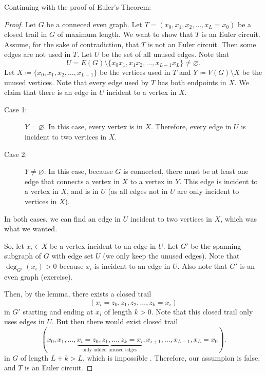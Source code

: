 
Continuing with the proof of Euler's Theorem:

\begin{proof}
	Let \( G \) be a conneced even graph. Let \( T = (x_{0}, x_{1}, x_{2}, \ldots , x_L = x_{0})\) be a closed trail in \( G \) of maximum length. We want to show that \( T \) is an Euler circuit. Assume, for the sake of contradiction, that \( T \) is not an Euler circuit. Then some edges are not used in \( T \). Let \( U \) be the set of all unused edges. Note that
	\[
		U = E(G) \setminus \{x_{0}x_{1}, x_{1}x_{2}, \ldots , x_{L-1}x_L\} \neq \varnothing
	.\] 
	Let \( X \coloneq \{x_{0}, x_{1}, x_{2}, \ldots , x_{L-1}\}   \) be the vertices used in \( T \) and \( Y \coloneqq V(G) \setminus X \) be the unused vertices. Note that every edge used by \( T \) has both endpoints in \( X \). We claim that there is an edge in \( U \) incident to a vertex in \( X \).
	\begin{description}
		\item[Case 1:]\( Y = \varnothing \). In this case, every vertex is in \( X \). Therefore, every edge in \( U \) is incident to two vertices in \( X \).
		\item[Case 2:] \( Y \neq \varnothing \). In this case, because \( G \) is connected, there must be at least one edge that connects a vertex in \( X \) to a vertex in \( Y \). This edge is incident to a vertex in \( X \), and is in \( U \) (as all edges not in \( U \) are only incident to vertices in \( X \)).
	\end{description}
	In both cases, we can find an edge in \( U \) incident to two vertices in \( X \), which was what we wanted. \par
	So, let \( x_i \in X \) be a vertex incident to an edge in \( U \). Let \( G' \) be the spanning subgraph of \( G \) with edge set \( U \) (we only keep the unused edges). Note that \( \deg_{G'}(x_i) > 0 \) because \( x_i \) is incident to an edge in \( U \). Also note that \( G' \) is an even graph (exercise). \par
	Then, by the lemma, there exists a closed trail \[
		(x_i=z_{0}, z_{1}, z_{2}, \ldots , z_k = x_i)
	\]  in \( G' \) starting and ending at \( x_i \) of length \( k > 0 \). Note that this closed trail only uses edges in \( U \). But then there would exist closed trail \[
	(x_{0}, x_{1}, \ldots , \underbrace{x_i = z_{0}, z_{1}, \ldots , z_k = x_i}_{\text{only added unused edges}}, x_{i+1}, \ldots , x_{L-1}, x_L = x_{0})
	.\] in \( G \) of length \( L + k > L \), which is impossible \contra. Therefore, our assumpion is false, and \( T \) is an Euler circuit.
\end{proof}

